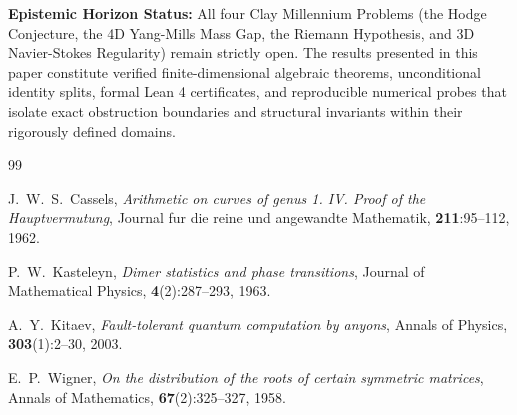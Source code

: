 \documentclass[11pt,a4paper]{article}
\theoremstyle{definition}
\begin{document}
\vspace{0.5em}
\noindent\textbf{Epistemic Horizon Status:} All four Clay Millennium Problems (the Hodge Conjecture, the 4D Yang-Mills Mass Gap, the Riemann Hypothesis, and 3D Navier-Stokes Regularity) remain strictly open. The results presented in this paper constitute verified finite-dimensional algebraic theorems, unconditional identity splits, formal Lean 4 certificates, and reproducible numerical probes that isolate exact obstruction boundaries and structural invariants within their rigorously defined domains.

\begin{thebibliography}{99}

J.~W.~S.~Cassels,
\textit{Arithmetic on curves of genus 1. IV. Proof of the Hauptvermutung},
Journal fur die reine und angewandte Mathematik, \textbf{211}:95--112, 1962.

P.~W.~Kasteleyn,
\textit{Dimer statistics and phase transitions},
Journal of Mathematical Physics, \textbf{4}(2):287--293, 1963.

A.~Y.~Kitaev,
\textit{Fault-tolerant quantum computation by anyons},
Annals of Physics, \textbf{303}(1):2--30, 2003.

E.~P.~Wigner,
\textit{On the distribution of the roots of certain symmetric matrices},
Annals of Mathematics, \textbf{67}(2):325--327, 1958.

\end{thebibliography}
\end{document}
